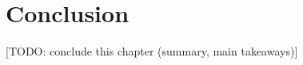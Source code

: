 
\section{Conclusion}
\label{st:event_sync_conclusion}
[TODO: conclude this chapter (summary, main takeaways)]
